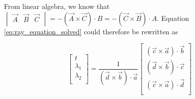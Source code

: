 From linear algebra, we  know  that $\begin{vmatrix} \vec{A} & \vec{B} & \vec{C}
\\ \end{vmatrix} =  -\left(  \vec{A}  \times  \vec{C}  \right) \cdot B = -\left(
\vec{C} \times \vec{B} \right) \cdot A$.  Equation  \ref{eq:ray_equation_solved}
could therefore be rewritten as

\begin{equation}
    \begin{bmatrix} t \\ \lambda_1 \\ \lambda_2 \\ \end{bmatrix} =
    \frac{1}{\left(\vec{d}\times\vec{b}\right)\cdot\vec{a}}
    \begin{bmatrix}
        \left(\vec{c}\times\vec{a}\right)\cdot\vec{b} \\
        \left(\vec{d}\times\vec{b}\right)\cdot\vec{c} \\
        \left(\vec{c}\times\vec{a}\right)\cdot\vec{d} \\
    \end{bmatrix}
\end{equation}


